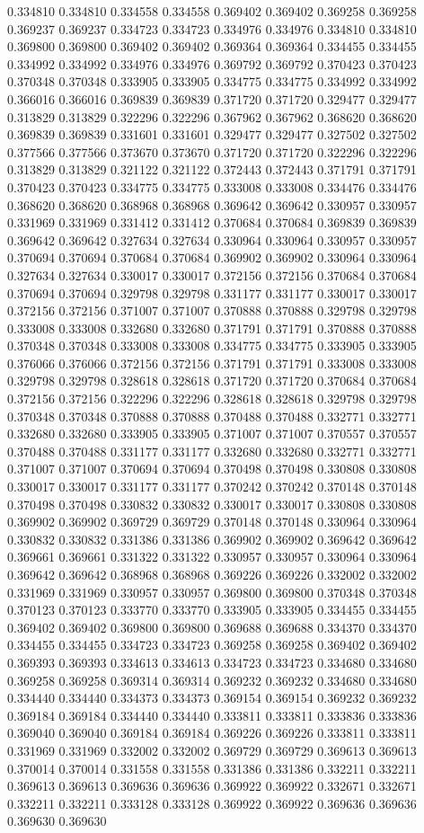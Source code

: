 0.334810 0.334810 0.334558 0.334558 0.369402 0.369402 0.369258 0.369258 0.369237 0.369237 0.334723 0.334723 0.334976 0.334976 0.334810 0.334810 0.369800 0.369800 0.369402 0.369402 0.369364 0.369364 0.334455 0.334455 0.334992 0.334992 0.334976 0.334976 0.369792 0.369792 0.370423 0.370423 0.370348 0.370348 0.333905 0.333905 0.334775 0.334775 0.334992 0.334992 0.366016 0.366016 0.369839 0.369839 0.371720 0.371720 0.329477 0.329477 0.313829 0.313829 0.322296 0.322296 0.367962 0.367962 0.368620 0.368620 0.369839 0.369839 0.331601 0.331601 0.329477 0.329477 0.327502 0.327502 0.377566 0.377566 0.373670 0.373670 0.371720 0.371720 0.322296 0.322296 0.313829 0.313829 0.321122 0.321122 0.372443 0.372443 0.371791 0.371791 0.370423 0.370423 0.334775 0.334775 0.333008 0.333008 0.334476 0.334476 0.368620 0.368620 0.368968 0.368968 0.369642 0.369642 0.330957 0.330957 0.331969 0.331969 0.331412 0.331412 0.370684 0.370684 0.369839 0.369839 0.369642 0.369642 0.327634 0.327634 0.330964 0.330964 0.330957 0.330957 0.370694 0.370694 0.370684 0.370684 0.369902 0.369902 0.330964 0.330964 0.327634 0.327634 0.330017 0.330017 0.372156 0.372156 0.370684 0.370684 0.370694 0.370694 0.329798 0.329798 0.331177 0.331177 0.330017 0.330017 0.372156 0.372156 0.371007 0.371007 0.370888 0.370888 0.329798 0.329798 0.333008 0.333008 0.332680 0.332680 0.371791 0.371791 0.370888 0.370888 0.370348 0.370348 0.333008 0.333008 0.334775 0.334775 0.333905 0.333905 0.376066 0.376066 0.372156 0.372156 0.371791 0.371791 0.333008 0.333008 0.329798 0.329798 0.328618 0.328618 0.371720 0.371720 0.370684 0.370684 0.372156 0.372156 0.322296 0.322296 0.328618 0.328618 0.329798 0.329798 0.370348 0.370348 0.370888 0.370888 0.370488 0.370488 0.332771 0.332771 0.332680 0.332680 0.333905 0.333905 0.371007 0.371007 0.370557 0.370557 0.370488 0.370488 0.331177 0.331177 0.332680 0.332680 0.332771 0.332771 0.371007 0.371007 0.370694 0.370694 0.370498 0.370498 0.330808 0.330808 0.330017 0.330017 0.331177 0.331177 0.370242 0.370242 0.370148 0.370148 0.370498 0.370498 0.330832 0.330832 0.330017 0.330017 0.330808 0.330808 0.369902 0.369902 0.369729 0.369729 0.370148 0.370148 0.330964 0.330964 0.330832 0.330832 0.331386 0.331386 0.369902 0.369902 0.369642 0.369642 0.369661 0.369661 0.331322 0.331322 0.330957 0.330957 0.330964 0.330964 0.369642 0.369642 0.368968 0.368968 0.369226 0.369226 0.332002 0.332002 0.331969 0.331969 0.330957 0.330957 0.369800 0.369800 0.370348 0.370348 0.370123 0.370123 0.333770 0.333770 0.333905 0.333905 0.334455 0.334455 0.369402 0.369402 0.369800 0.369800 0.369688 0.369688 0.334370 0.334370 0.334455 0.334455 0.334723 0.334723 0.369258 0.369258 0.369402 0.369402 0.369393 0.369393 0.334613 0.334613 0.334723 0.334723 0.334680 0.334680 0.369258 0.369258 0.369314 0.369314 0.369232 0.369232 0.334680 0.334680 0.334440 0.334440 0.334373 0.334373 0.369154 0.369154 0.369232 0.369232 0.369184 0.369184 0.334440 0.334440 0.333811 0.333811 0.333836 0.333836 0.369040 0.369040 0.369184 0.369184 0.369226 0.369226 0.333811 0.333811 0.331969 0.331969 0.332002 0.332002 0.369729 0.369729 0.369613 0.369613 0.370014 0.370014 0.331558 0.331558 0.331386 0.331386 0.332211 0.332211 0.369613 0.369613 0.369636 0.369636 0.369922 0.369922 0.332671 0.332671 0.332211 0.332211 0.333128 0.333128 0.369922 0.369922 0.369636 0.369636 0.369630 0.369630 